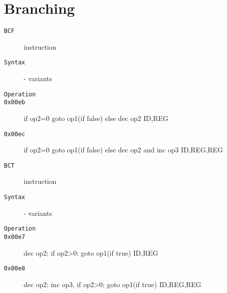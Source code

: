 \section{Branching}
\begin{description}
\item[\texttt{BCF}] instruction\\
\item[\texttt{Syntax}] - variants\\

\item[\texttt{Operation}]
\item[\texttt{}]
\item[\texttt{0x00eb}] if op2=0 goto op1(if false) else dec op2  {ID,REG}            \\
\item[\texttt{0x00ec}] if op2=0 goto op1(if false) else dec op2 and inc op3  {ID,REG,REG}        \\
\end{description}
\clearpage
\begin{description}
\item[\texttt{BCT}] instruction\\
\item[\texttt{Syntax}] - variants\\

\item[\texttt{Operation}]
\item[\texttt{}]
\item[\texttt{0x00e7}] dec op2; if op2>0; goto op1(if true)  {ID,REG}            \\
\item[\texttt{0x00e8}] dec op2; inc op3, if op2>0; goto op1(if true)  {ID,REG,REG}        \\
\end{description}
